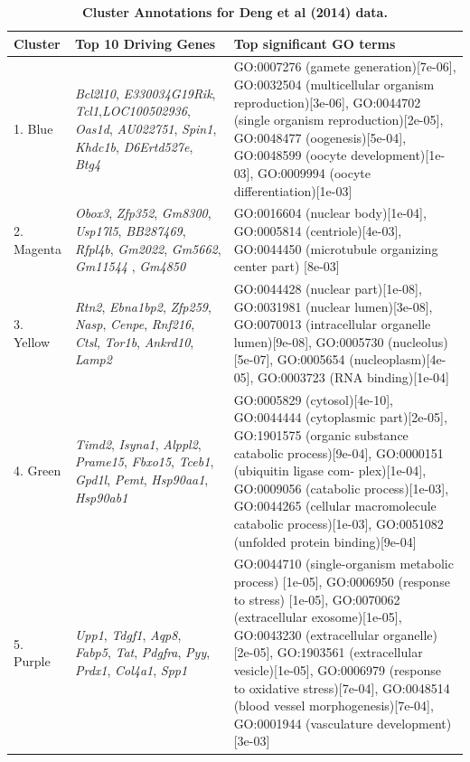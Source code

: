 \documentclass[10pt,letterpaper]{article}
\begin{document}
\begin{table}[!hp]
\begin{adjustwidth}{-2in}{0in} %
\footnotesize
\centering
\caption{\bf Cluster Annotations for Deng et al (2014) data.}
\renewcommand{\arraystretch}{1.7}
\begin{tabular}{|p{1.0in}|p{1.5in}|p{4.3in}|}
\hline
Cluster & Top 10 Driving \qquad Genes &  Top significant GO terms \\
\hline
1. Blue & \textit{Bcl2l10}, \textit{E330034G19Rik}, \textit{Tcl1},\textit{LOC100502936}, \textit{Oas1d}, \textit{AU022751}, \textit{Spin1}, \textit{Khdc1b}, \textit{D6Ertd527e}, \textit{Btg4} & GO:0007276 (gamete generation)[7e-06], GO:0032504 (multicellular organism reproduction)[3e-06], GO:0044702 (single organism reproduction)[2e-05], GO:0048477 (oogenesis)[5e-04], GO:0048599 (oocyte development)[1e-03], GO:0009994 (oocyte differentiation)[1e-03] \\
\hline
2. Magenta & \textit{Obox3}, \textit{Zfp352}, \textit{Gm8300}, \textit{Usp17l5}, \textit{BB287469}, \textit{Rfpl4b}, \textit{Gm2022}, \textit{Gm5662}, \textit{Gm11544 }, \textit{Gm4850}
& GO:0016604 (nuclear body)[1e-04], GO:0005814 (centriole)[4e-03], GO:0044450 (microtubule organizing center part) [8e-03] \\
\hline
3. Yellow & \textit{Rtn2}, \textit{Ebna1bp2}, \textit{Zfp259}, \textit{Nasp}, \textit{Cenpe}, \textit{Rnf216}, \textit{Ctsl}, \textit{Tor1b}, \textit{Ankrd10}, \textit{Lamp2} & GO:0044428 (nuclear part)[1e-08], GO:0031981 (nuclear lumen)[3e-08], GO:0070013 (intracellular organelle lumen)[9e-08], GO:0005730 (nucleolus)[5e-07], GO:0005654 (nucleoplasm)[4e-05],  GO:0003723 (RNA binding)[1e-04] \\
\hline
4. Green
&  \textit{Timd2}, \textit{Isyna1}, \textit{Alppl2}, \textit{Prame15},  \textit{Fbxo15}, \textit{Tceb1}, \textit{Gpd1l}, \textit{Pemt}, \textit{Hsp90aa1}, \textit{Hsp90ab1}
& GO:0005829 (cytosol)[4e-10], GO:0044444 (cytoplasmic part)[2e-05], GO:1901575 (organic substance catabolic process)[9e-04], GO:0000151 (ubiquitin ligase com- plex)[1e-04],  GO:0009056 (catabolic process)[1e-03], GO:0044265 (cellular macromolecule catabolic process)[1e-03], GO:0051082 (unfolded protein binding)[9e-04] \\
\hline
5. Purple & \textit{Upp1}, \textit{Tdgf1}, \textit{Aqp8}, \textit{Fabp5}, \textit{Tat}, \textit{Pdgfra}, \textit{Pyy}, \textit{Prdx1}, \textit{Col4a1}, \textit{Spp1}
& GO:0044710 (single-organism metabolic process) [1e-05], GO:0006950 (response to stress) [1e-05], GO:0070062 (extracellular exosome)[1e-05], GO:0043230 (extracellular organelle)[2e-05], GO:1903561 (extracellular vesicle)[1e-05], GO:0006979 (response to oxidative stress)[7e-04], GO:0048514 (blood vessel morphogenesis)[7e-04], GO:0001944 (vasculature development)[3e-03] \\

\end{tabular}
\end{adjustwidth}
\end{table}
\end{document}
